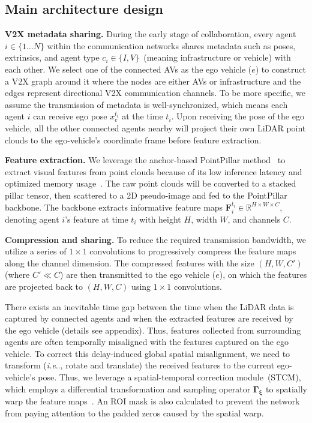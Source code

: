 \documentclass[runningheads]{llncs}
\makeatletter
\DeclareRobustCommand\onedot{\futurelet\@let@token\@onedot}
\def\@onedot{\ifx\@let@token.\else.\null\fi\xspace}
\def\ie{\emph{i.e}\onedot} \def\Ie{\emph{I.e}\onedot}
\makeatother
\begin{document}
\subsection{Main architecture design}
\label{ssec:overall}

\noindent\textbf{V2X metadata sharing.}
During the early stage of collaboration, every agent $i\in\{1\dots N\}$ within the communication networks shares metadata such as poses, extrinsics, and agent type $c_i\in\{I, V\}$~(meaning infrastructure or vehicle) with each other. We select one of the connected AVs as the ego vehicle ($e$) to construct a V2X graph around it where the nodes are either AVs or infrastructure and the edges represent directional V2X communication channels.  
To be more specific, we assume the transmission of metadata is well-synchronized, which means each agent $i$ can receive ego pose $x_{e}^{t_i}$ at the time $t_i$. Upon receiving the pose of the ego vehicle, all the other connected agents nearby will project their own LiDAR point clouds to the ego-vehicle's coordinate frame before feature extraction. 

\noindent\textbf{Feature extraction.} We leverage the anchor-based PointPillar method~\cite{lang2019pointpillars} to extract visual features from point clouds because of its low inference latency and optimized memory usage~\cite{xu2021opv2v}. The raw point clouds will be converted to a stacked pillar tensor, then scattered to a 2D pseudo-image and fed to the PointPillar backbone. The backbone extracts informative feature maps $\mathbf{F}_i^{t_i}\in \mathbb{R}^{H \times W \times C}$, denoting agent $i$'s feature at time $t_i$ with  height $H$, width $W$, and channels $C$.

\noindent\textbf{Compression and sharing.} 
To reduce the required transmission bandwidth, we utilize a series of $1\times1$ convolutions to progressively compress the feature maps along the channel dimension. The compressed features with the size $(H,W,C')$ (where $C'\ll C$) are then transmitted to the ego vehicle ($e$), on which the features are projected back to $(H,W,C)$ using $1 \times 1$ convolutions.

There exists an inevitable time gap between the time when the LiDAR data is captured by connected agents and when the extracted features are received by the ego vehicle (details see appendix). Thus, features collected from surrounding agents are often temporally misaligned with the features captured on the ego vehicle.
To correct this delay-induced global spatial misalignment, we need to transform (\ie, rotate and translate) the received features to the current ego-vehicle's pose. Thus, we leverage a spatial-temporal correction module~(STCM), which employs a differential transformation and sampling operator $\mathbf{\Gamma_{\xi}}$ to spatially warp the feature maps~\cite{jaderberg2015spatial}. An ROI mask is also calculated to prevent the network from paying attention to the padded zeros caused by the spatial warp.
\end{document}
